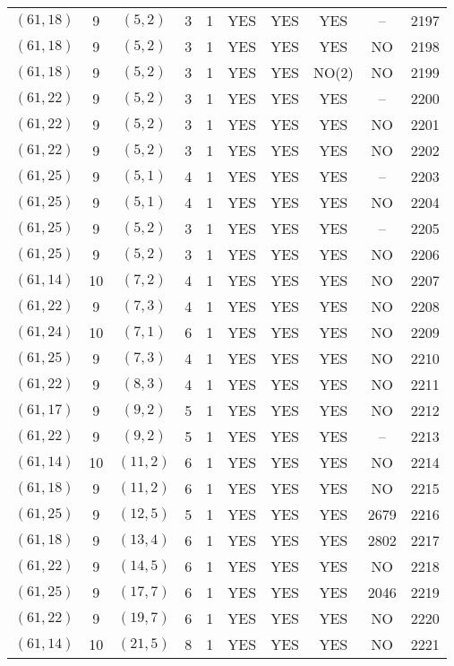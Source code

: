 \begin{longtable}{|c|c|c|c|c|c|c|c|c|c|}
$(61, 18)$ & 9 & $(5, 2)$ & 3 & 1 & YES & YES & YES & -- & 2197\\
$(61, 18)$ & 9 & $(5, 2)$ & 3 & 1 & YES & YES & YES & NO & 2198\\
$(61, 18)$ & 9 & $(5, 2)$ & 3 & 1 & YES & YES & NO(2) & NO & 2199\\
$(61, 22)$ & 9 & $(5, 2)$ & 3 & 1 & YES & YES & YES & -- & 2200\\
$(61, 22)$ & 9 & $(5, 2)$ & 3 & 1 & YES & YES & YES & NO & 2201\\
$(61, 22)$ & 9 & $(5, 2)$ & 3 & 1 & YES & YES & YES & NO & 2202\\
$(61, 25)$ & 9 & $(5, 1)$ & 4 & 1 & YES & YES & YES & -- & 2203\\
$(61, 25)$ & 9 & $(5, 1)$ & 4 & 1 & YES & YES & YES & NO & 2204\\
$(61, 25)$ & 9 & $(5, 2)$ & 3 & 1 & YES & YES & YES & -- & 2205\\
$(61, 25)$ & 9 & $(5, 2)$ & 3 & 1 & YES & YES & YES & NO & 2206\\
$(61, 14)$ & 10 & $(7, 2)$ & 4 & 1 & YES & YES & YES & NO & 2207\\
$(61, 22)$ & 9 & $(7, 3)$ & 4 & 1 & YES & YES & YES & NO & 2208\\
$(61, 24)$ & 10 & $(7, 1)$ & 6 & 1 & YES & YES & YES & NO & 2209\\
$(61, 25)$ & 9 & $(7, 3)$ & 4 & 1 & YES & YES & YES & NO & 2210\\
$(61, 22)$ & 9 & $(8, 3)$ & 4 & 1 & YES & YES & YES & NO & 2211\\
$(61, 17)$ & 9 & $(9, 2)$ & 5 & 1 & YES & YES & YES & NO & 2212\\
$(61, 22)$ & 9 & $(9, 2)$ & 5 & 1 & YES & YES & YES & -- & 2213\\
$(61, 14)$ & 10 & $(11, 2)$ & 6 & 1 & YES & YES & YES & NO & 2214\\
$(61, 18)$ & 9 & $(11, 2)$ & 6 & 1 & YES & YES & YES & NO & 2215\\
$(61, 25)$ & 9 & $(12, 5)$ & 5 & 1 & YES & YES & YES & 2679 & 2216\\
$(61, 18)$ & 9 & $(13, 4)$ & 6 & 1 & YES & YES & YES & 2802 & 2217\\
$(61, 22)$ & 9 & $(14, 5)$ & 6 & 1 & YES & YES & YES & NO & 2218\\
$(61, 25)$ & 9 & $(17, 7)$ & 6 & 1 & YES & YES & YES & 2046 & 2219\\
$(61, 22)$ & 9 & $(19, 7)$ & 6 & 1 & YES & YES & YES & NO & 2220\\
$(61, 14)$ & 10 & $(21, 5)$ & 8 & 1 & YES & YES & YES & NO & 2221\\

\end{longtable}
